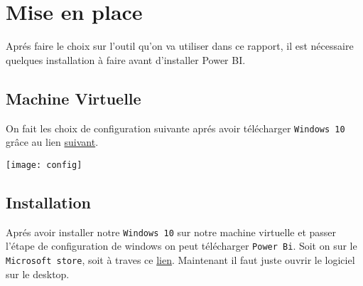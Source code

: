 \documentclass[french,a4paper,11pt,oneside]{book}
\begin{document}
	\section{Mise en place}{
		Aprés faire le choix sur l'outil qu'on va utiliser dans ce rapport, il est nécessaire quelques installation à faire avant d'installer Power BI.\\
			\subsection{Machine Virtuelle}{
				On fait les choix de configuration suivante aprés avoir télécharger \texttt {Windows 10} grâce au lien \href{https://www.microsoft.com/fr-fr/software-download/windows10ISO}{suivant}.
				
				\texttt{[image: config]}
			}
			\subsection{Installation}{
				Aprés avoir installer notre \texttt{Windows 10} sur notre machine virtuelle et passer l'étape de configuration de windows on peut télécharger \texttt{Power Bi}.
				Soit on sur le \texttt{Microsoft store}, soit à traves ce \href{https://www.microsoft.com/fr-fr/download/details.aspx?id=58494}{lien}.
				Maintenant il faut juste ouvrir le logiciel sur le desktop.
			}
	}
	\newpage
\end{document}
